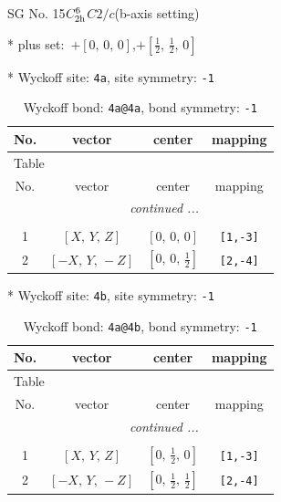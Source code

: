 \documentclass[fleqn,8pt]{jsarticle}
\begin{document}
\setcounter{MaxMatrixCols}{32}

\renewcommand{\tablename}{Table~}
\renewcommand{\figurename}{Figure~}
\begin{center}
\LARGE
SG No. 15\quad$C_{\rm 2h}^{6}$\quad$C2/c$\quad(b-axis setting)\quad[ monoclinic ]
\end{center}

* plus set:\,\,\,$+\left[ 0,\, 0,\, 0 \right]$,\quad $+\left[ \frac{1}{2},\, \frac{1}{2},\, 0 \right]$


* Wyckoff site: {\tt 4a}, site symmetry: {\tt -1}
\renewcommand{\arraystretch}{1.2}
\begin{longtable}{cccc}
\caption{Wyckoff bond: {\tt 4a@4a}, bond symmetry: {\tt -1}}
 \\
 \hline \hline
No. & vector & center & mapping \\ \hline \endfirsthead

\multicolumn{3}{l}{\tablename\ \thetable{}} \\
 \hline \hline
No. & vector & center & mapping \\ \hline \endhead

 \hline \hline
\multicolumn{3}{r}{\footnotesize\it continued ...} \\ \endfoot

 \hline \hline
\multicolumn{3}{r}{} \\ \endlastfoot

1 & $\left[ X,\, Y,\, Z \right]$ & $\left[ 0,\, 0,\, 0 \right]$ & {\tt [1,-3]} \\ \hline
2 & $\left[ - X,\, Y,\, - Z \right]$ & $\left[ 0,\, 0,\, \frac{1}{2} \right]$ & {\tt [2,-4]} \\
\end{longtable}
* Wyckoff site: {\tt 4b}, site symmetry: {\tt -1}
\renewcommand{\arraystretch}{1.2}
\begin{longtable}{cccc}
\caption{Wyckoff bond: {\tt 4a@4b}, bond symmetry: {\tt -1}}
 \\
 \hline \hline
No. & vector & center & mapping \\ \hline \endfirsthead

\multicolumn{3}{l}{\tablename\ \thetable{}} \\
 \hline \hline
No. & vector & center & mapping \\ \hline \endhead

 \hline \hline
\multicolumn{3}{r}{\footnotesize\it continued ...} \\ \endfoot

 \hline \hline
\multicolumn{3}{r}{} \\ \endlastfoot

1 & $\left[ X,\, Y,\, Z \right]$ & $\left[ 0,\, \frac{1}{2},\, 0 \right]$ & {\tt [1,-3]} \\ \hline
2 & $\left[ - X,\, Y,\, - Z \right]$ & $\left[ 0,\, \frac{1}{2},\, \frac{1}{2} \right]$ & {\tt [2,-4]} \\
\end{longtable}
\end{document}

